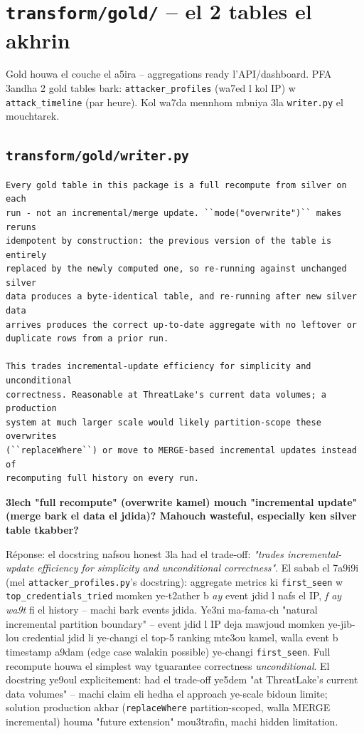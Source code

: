 \documentclass[11pt,a4paper]{report}
\DeclareRobustCommand{\code}[1]{\texttt{#1}}
\DeclareRobustCommand{\file}[1]{\texttt{\color{amber}#1}}
\begin{document}
\chapter{\file{transform/gold/} -- el 2 tables el akhrin}

Gold houwa el couche el a5ira -- aggregations ready l'API/dashboard.
PFA 3andha 2 gold tables bark: \code{attacker\_profiles} (wa7ed l kol IP)
w \code{attack\_timeline} (par heure). Kol wa7da mennhom mbniya 3la
\code{writer.py} el mouchtarek.

\section{\file{transform/gold/writer.py}}

\begin{lstlisting}[style=pystyle]
Every gold table in this package is a full recompute from silver on each
run - not an incremental/merge update. ``mode("overwrite")`` makes reruns
idempotent by construction: the previous version of the table is entirely
replaced by the newly computed one, so re-running against unchanged silver
data produces a byte-identical table, and re-running after new silver data
arrives produces the correct up-to-date aggregate with no leftover or
duplicate rows from a prior run.

This trades incremental-update efficiency for simplicity and unconditional
correctness. Reasonable at ThreatLake's current data volumes; a production
system at much larger scale would likely partition-scope these overwrites
(``replaceWhere``) or move to MERGE-based incremental updates instead of
recomputing full history on every run.
\end{lstlisting}

\begin{soual}
\textbf{3lech "full recompute" (overwrite kamel) mouch "incremental update"
(merge bark el data el jdida)? Mahouch wasteful, especially ken silver
table tkabber?}

Réponse: el docstring nafsou honest 3la had el trade-off: \emph{"trades
incremental-update efficiency for simplicity and unconditional
correctness"}. El sabab el 7a9i9i (mel \code{attacker\_profiles.py}'s
docstring): aggregate metrics ki \code{first\_seen} w \code{top\_credentials\_tried}
momken ye-t2ather b \emph{ay} event jdid l nafs el IP, \emph{f ay wa9t}
fi el history -- machi bark events jdida. Ye3ni ma-fama-ch "natural
incremental partition boundary" -- event jdid l IP deja mawjoud momken
ye-jib-lou credential jdid li ye-changi el top-5 ranking mte3ou kamel,
walla event b timestamp a9dam (edge case walakin possible) ye-changi
\code{first\_seen}. Full recompute houwa el simplest way tguarantee
correctness \emph{unconditional}. El docstring ye9oul explicitement:
had el trade-off ye5dem "at ThreatLake's current data volumes" -- machi
claim eli hedha el approach ye-scale bidoun limite; solution production
akbar (\code{replaceWhere} partition-scoped, walla MERGE incremental)
houma "future extension" mou3trafin, machi hidden limitation.
\end{soual}
\end{document}

